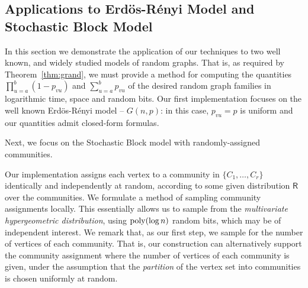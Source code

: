 \subsection{Applications to Erd\"{o}s-R\'{e}nyi Model and Stochastic Block Model}
\label{sec:applications}
In this section we demonstrate the application of our techniques to
two well known, and widely studied models of random graphs. That is, as required by Theorem~\ref{thm:grand}, we must provide a method for computing the quantities $\prod_{u=a}^b (1-p_{vu})$ and $\sum_{u=a}^b p_{vu}$ of the desired random graph families in logarithmic time, space and random bits.
Our first implementation focuses on the well known Erd\"{o}s-R\'{e}nyi model -- $G(n,p)$: in this case, $p_{vu} = p$ is uniform and our quantities admit closed-form formulas.

Next, we focus on the Stochastic Block model with randomly-assigned communities.
\iffalse
{\color{red}In this case, a naive solution would be to simply assign communities to contiguous blocks of indices.
In such a setting, the problem of calculating $\mathsf{F}(v,a,b)$, simply reduces to the $G(n,p)$ case,
with some additional case analysis to check when we are at a community boundary.
However, this setup is unrealistic,
and not particularly useful in the context of the Stochastic Block model.
In fact most algorithms operating on these graphs,
are trying to unveil the underlying community structure.}
{\color{blue} I'd say these motivations should show up in intro or preliminaries (for the full version)}
\fi
Our implementation assigns each vertex to a community in $\{C_1, \ldots, C_r\}$ identically and independently at random, according to some given distribution $\mathsf{R}$ over the communities. We formulate a method of sampling community assignments locally.
This essentially allows us to sample from the \emph{multivariate hypergeometric distribution},
using $\mathrm{poly}(\log n)$ random bits, which may be of independent interest. We remark that, as our first step, we sample for the number of vertices of each community. That is, our construction can alternatively support the community assignment where the number of vertices of each community is given, under the assumption that the \emph{partition} of the vertex set into communities is chosen uniformly at random.

